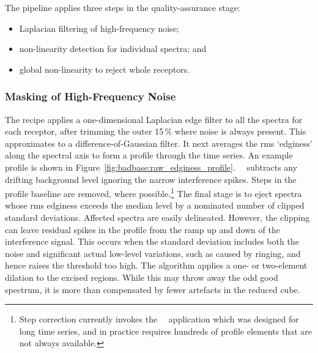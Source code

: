 \documentclass[final,authoryear,5p,times,twocolumn]{elsarticle}
\begin{document}
The pipeline applies three steps in the quality-assurance stage:
\begin{itemize}
\item Laplacian filtering of high-frequency noise;
\item non-linearity detection for individual spectra; and
\item global non-linearity to reject whole receptors.
\end{itemize}

\subsubsection{Masking of High-Frequency Noise}

The recipe applies a one-dimensional Laplacian edge filter to all the
spectra for each receptor, after trimming the outer 15\,\% where noise
is always present.  This approximates to a difference-of-Gaussian
filter.  It next averages the rms `edginess' along the spectral axis
to form a profile through the time series.  An example profile is
shown in Figure~\ref{fig:badbase:raw_edginess_profile}.  \cupid\
\findback\ subtracts any drifting background level ignoring the narrow
interference spikes.  Steps in the profile baseline are removed, where
possible.\footnote{Step correction currently invokes the \smurf\ \fixsteps\
application which was designed for long time series, and in practice
requires hundreds of profile elements that are not always available.}
The final stage is to eject spectra whose rms edginess exceeds the
median level by a nominated number of clipped standard deviations.
Affected spectra are easily delineated.  However, the clipping can
leave residual spikes in the profile from the ramp up and down of the
interference signal.  This occurs when the standard deviation includes
both the noise and significant actual low-level variations, such as
caused by ringing, and hence raises the threshold too high.  The
algorithm applies a one- or two-element dilation to the excised
regions.  While this may throw away the odd good spectrum, it is more
than compensated by fewer artefacts in the reduced cube.
\end{document}
